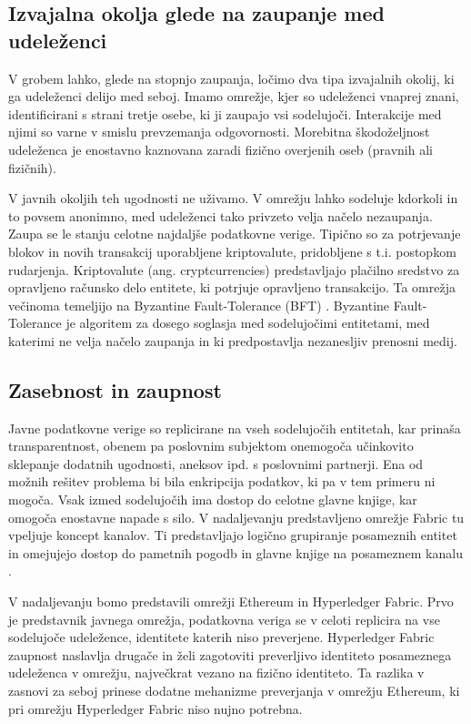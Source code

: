 \documentclass[a4paper, 12pt]{book}
\begin{document}
\subsection{Izvajalna okolja glede na zaupanje med udeleženci}
V grobem lahko, glede na stopnjo zaupanja, ločimo dva tipa izvajalnih okolij, ki ga udeleženci delijo med seboj.
Imamo omrežje, kjer so udeleženci vnaprej znani, identificirani s strani tretje osebe, ki ji zaupajo vsi sodelujoči.
Interakcije med njimi so varne v smislu prevzemanja odgovornosti.
Morebitna škodoželjnost udeleženca je enostavno kaznovana zaradi fizično overjenih oseb (pravnih ali fizičnih).

V javnih okoljih teh ugodnosti ne uživamo.
V omrežju lahko sodeluje kdorkoli in to povsem anonimno,
med udeleženci tako privzeto velja načelo nezaupanja.
Zaupa se le stanju celotne najdaljše podatkovne verige.
Tipično so za potrjevanje blokov in novih transakcij uporabljene kriptovalute, pridobljene s t.i. postopkom rudarjenja.
Kriptovalute (ang. cryptcurrencies) predstavljajo plačilno sredstvo za opravljeno računsko delo entitete, ki potrjuje opravljeno transakcijo.
Ta omrežja večinoma temeljijo na Byzantine Fault-Tolerance (BFT) \cite{hyperledgerDocs, castro1999practical}.
Byzantine Fault-Tolerance je algoritem za dosego soglasja med sodelujočimi entitetami, med katerimi ne velja načelo zaupanja in ki predpostavlja nezanesljiv prenosni medij.

\subsection{Zasebnost in zaupnost}
Javne podatkovne verige so replicirane na vseh sodelujočih entitetah, kar prinaša transparentnost, obenem pa poslovnim subjektom onemogoča učinko\-vito sklepanje dodatnih ugodnosti, aneksov ipd. s poslovnimi partnerji.
Ena od možnih rešitev problema bi bila enkripcija podatkov, ki pa v tem primeru ni mogoča.
Vsak izmed sodelujočih ima dostop do celotne glavne knjige, kar omogoča enostavne napade s silo.
V nadaljevanju predstavljeno omrežje Fabric tu vpeljuje koncept kanalov.
Ti predstavljajo logično grupiranje posameznih entitet in omejujejo dostop do pametnih pogodb in glavne knjige na posameznem kanalu \cite{hyperledgerDocs}.

V nadaljevanju bomo predstavili omrežji Ethereum in Hyperledger Fabric.
Prvo je predstavnik javnega omrežja, podatkovna veriga se v celoti replicira na vse sodelujoče udeležence, identitete katerih niso preverjene.
Hyperledger Fabric zaupnost naslavlja drugače in želi zagotoviti preverljivo identiteto posameznega udeleženca v omrežju, največkrat vezano na fizično identiteto.
Ta razlika v zasnovi za seboj prinese dodatne mehanizme preverjanja v omrežju Ethereum, ki pri omrežju Hyperledger Fabric niso nujno potrebna.
\end{document}
